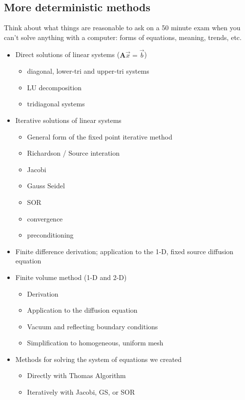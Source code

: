 \documentclass[12pt]{article}
\newcommand{\ve}[1]{\ensuremath{\mathbf{#1}}}
\begin{document}
\subsection*{More deterministic methods}
Think about what things are reasonable to ask on a 50 minute exam when you can't solve anything with a computer: forms of equations, meaning, trends, etc.
\begin{itemize}
\item Direct solutions of linear systems ($\ve{A}\vec{x} = \vec{b}$)
  \begin{itemize}
  \item diagonal, lower-tri and upper-tri systems
  \item LU decomposition
  \item tridiagonal systems
  \end{itemize}

\item Iterative solutions of linear systems
  \begin{itemize}
  \item General form of the fixed point iterative method
  \item Richardson / Source interation
  \item Jacobi
  \item Gauss Seidel
  \item SOR
  \item convergence
  \item preconditioning
  \end{itemize}


\item Finite difference derivation; application to the 1-D, fixed source diffusion equation
\item Finite volume method (1-D and 2-D)
  \begin{itemize}
  \item Derivation
  \item Application to the diffusion equation
  \item Vacuum and reflecting boundary conditions
  \item Simplification to homogeneous, uniform mesh
  \end{itemize}
  
\item Methods for solving the system of equations we created
  \begin{itemize}
  \item Directly with Thomas Algorithm
  \item Iteratively with Jacobi, GS, or SOR
  \end{itemize}


\end{itemize}
\end{document}
